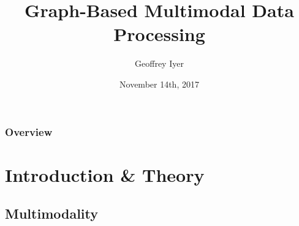 \documentclass{beamer}
\title[Graph-Based Multimodal Data Processing]{Graph-Based Multimodal Data Processing} %
\author{Geoffrey Iyer} %
\institute[UCLA] %
{
  University of California, Los Angeles \\ %
  GIPSA Lab, Universit\'{e} Grenoble Alpes \\
  \medskip
  \textit{gsiyer@math.ucla.edu} %
}
\date{November 14th, 2017} %
\begin{document}
\begin{frame}
  \titlepage %
\end{frame}

\begin{frame}
  \frametitle{Overview} %
  \tableofcontents %
\end{frame}




\section{Introduction \& Theory} %

\subsection{Multimodality} %
\end{document}
